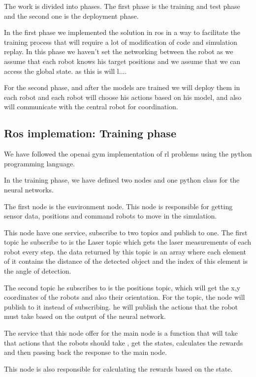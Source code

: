 \documentclass[12pt]{extarticle}
\begin{document}
The work is divided into phases. The first phase is the training and test phase and the second one is the deployment phase.

In the first phase we implemented the solution in ros in a way to facilitate the training process that will require a lot of modification of code and simulation replay. In this phase   we haven't set the networking between the robot as we assume that each robot knows his target positions and we assume that we can access the global state.  as this is will l....


For the second phase, and after the models are trained we will deploy them in each robot and each robot will choose his actions based on his model, and also will communicate with the central robot for coordination.


\subsection{Ros implemation: Training phase}

We have followed the openai gym implementation of  rl problems using the python programming language.

In the training phase, we have defined two nodes and one python class for the neural networks.
 

The first node is the environment node. This node is responsible for getting sensor data, positions and command robots to move in the simulation.

This node have one service, subscribe to  two topics and publish to one. The first topic he subscribe to is the Laser topic which gets the laser measurements of each robot every step. the data returned   by this topic is an array where each element of it contains the distance of the detected object and the index of this element is the angle of detection.


The second topic he subscribes to is the positions topic, which will get the x,y coordinates of the robots and also their orientation. For the topic, the node will publish to it instead of subscribing. he will publish the actions that the robot must take based on the output of the neural network.

The service that this node offer for the main node is  a function that will take that actions that the robots should take , get the states, calculates the rewards and then passing back the response to the main node. 

This node is also responsible for calculating the rewards based on the state.
\end{document}
